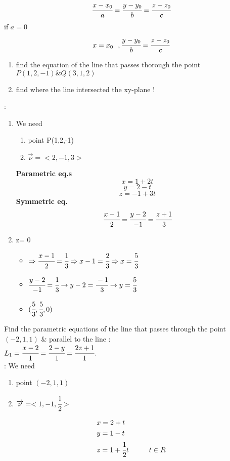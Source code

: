  {\color{smalt(darkpowderblue)}{symmetric equation}}
 $$\cfrac{x-x_0}{a} = \cfrac{y-y_0}{b} = \cfrac{z-z_0}{c}$$
 if $a=0$
 $$ x=x_0 ~~, \cfrac{y-y_0}{b} = \cfrac{z-z_0}{c}$$
 \noindent{\color{smalt(darkpowderblue)}\rule{\linewidth}{.2mm}}
\begin{example}
\begin{enumerate}
    \item find the equation of the line that passes thorough the point $P(1,2,-1) \& Q(3,1,2)$
    \item  find where the line intersected the xy-plane !
\end{enumerate}
  {} : 
  \begin{enumerate}
      \item We need 
  \begin{enumerate}
      \item point P(1,2,-1)
      \item $\overrightarrow{\nu} = <2,-1,3>$
      \end{enumerate}

\textbf{Parametric eq.s}
$$x = 1+2t$$               
$$y= 2-t$$
$$z = -1+3t$$
\textbf{Symmetric eq.}
$$\cfrac{x-1}{2} = \cfrac{y-2}{-1} = \cfrac{z+1}{3}$$
\item  z= 0  
\begin{itemize}
    \item $\Rightarrow \cfrac{x-1}{2} = \cfrac{1}{3} \\ \Rightarrow x-1 =\cfrac{2}{3} \\ \Rightarrow x = \cfrac{5}{3}$ 
    \item $\cfrac{y-2}{-1} = \cfrac{1}{3} \rightarrow y-2 = \cfrac{-1}{3} \rightarrow y=\cfrac{5}{3}$
    \item $(\cfrac{5}{3} , \cfrac{5}{3} , 0)$
\end{itemize}
 \end{enumerate}
 \end{example}
 \noindent{\color{smalt(darkpowderblue)}\rule{\linewidth}{.2mm}}
\begin{example}
Find the parametric equations of the line that passes through the point $(-2,1,1)$ \& parallel to the line :\\$L_1 = \cfrac{x-2}{1} = \cfrac{2-y}{1} = \cfrac{2z+1}{1}.$\\
  {}: We need 
\begin{enumerate}
    \item  point $(-2,1,1)$
    \item $\overrightarrow{\nu} = <1,-1,\cfrac{1}{2}>$
\end{enumerate}
\begin{align*}
    &x=2+t \\
    &y=1-t \\
    &z=1+\cfrac{1}{2}t \hspace{1cm} t \in R
\end{align*}
\end{example}
